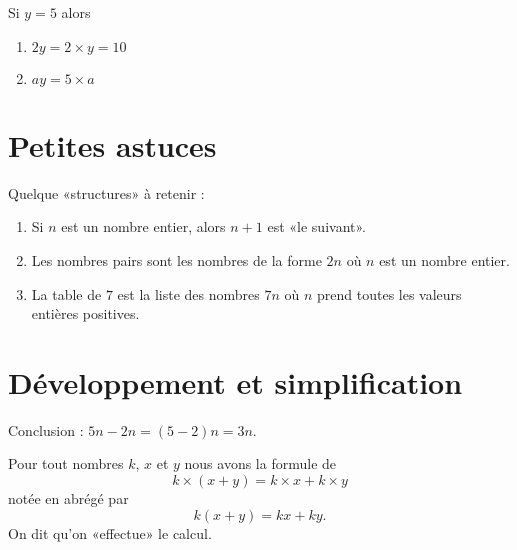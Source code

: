 \begin{example}
    Si \( y=5\) alors
    \begin{enumerate}
        \item
            \( 2y=2\times y=10\)
        \item
            \( ay=5\times a\)
    \end{enumerate}
\end{example}

\section{Petites astuces}

Quelque «structures» à retenir :
\begin{enumerate}
    \item
        Si \( n\) est un nombre entier, alors \( n+1\) est «le suivant».
    \item
        Les nombres pairs sont les nombres de la forme \( 2n\) où \( n\) est un nombre entier.
    \item
        La table de \( 7\) est la liste des nombres \( 7n\) où \( n\) prend toutes les valeurs entières positives.
\end{enumerate}

\section{Développement et simplification}



Conclusion : \( 5n-2n=(5-2)n=3n\).

\begin{propriete}
    Pour tout nombres \( k\), \( x\) et \( y\) nous avons la formule de 
    \begin{equation}
        k\times (x+y)=k\times x+k\times y
    \end{equation}
    notée en abrégé par
    \begin{equation}
        k(x+y)=kx+ky.
    \end{equation}
    On dit qu'on «effectue» le calcul.
\end{propriete}

